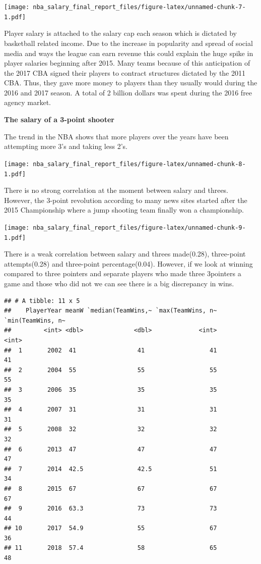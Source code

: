 \documentclass[]{article}
\begin{document}
\texttt{[image: nba\_salary\_final\_report\_files/figure-latex/unnamed-chunk-7-1.pdf]}

Player salary is attached to the salary cap each season which is
dictated by basketball related income. Due to the increase in popularity
and spread of social media and ways the league can earn revenue this
could explain the huge spike in player salaries beginning after 2015.
Many teams because of this anticipation of the 2017 CBA signed their
players to contract structures dictated by the 2011 CBA. Thus, they gave
more money to players than they usually would during the 2016 and 2017
season. A total of 2 billion dollars was spent during the 2016 free
agency market.

\textbf{The salary of a 3-point shooter}

The trend in the NBA shows that more players over the years have been
attempting more 3's and taking less 2's.

\texttt{[image: nba\_salary\_final\_report\_files/figure-latex/unnamed-chunk-8-1.pdf]}

There is no strong correlation at the moment between salary and threes.
However, the 3-point revolution according to many news sites started
after the 2015 Championship where a jump shooting team finally won a
championship.

\texttt{[image: nba\_salary\_final\_report\_files/figure-latex/unnamed-chunk-9-1.pdf]}

There is a weak correlation between salary and threes made(0.28),
three-point attempts(0.28) and three-point percentage(0.04). However, if
we look at winning compared to three pointers and separate players who
made three 3pointers a game and those who did not we can see there is a
big discrepancy in wins.

\begin{verbatim}
## # A tibble: 11 x 5
##    PlayerYear meanW `median(TeamWins,~ `max(TeamWins, n~ `min(TeamWins, n~
##         <int> <dbl>              <dbl>             <int>             <int>
##  1       2002  41                 41                  41                41
##  2       2004  55                 55                  55                55
##  3       2006  35                 35                  35                35
##  4       2007  31                 31                  31                31
##  5       2008  32                 32                  32                32
##  6       2013  47                 47                  47                47
##  7       2014  42.5               42.5                51                34
##  8       2015  67                 67                  67                67
##  9       2016  63.3               73                  73                44
## 10       2017  54.9               55                  67                36
## 11       2018  57.4               58                  65                48
\end{verbatim}
\end{document}
